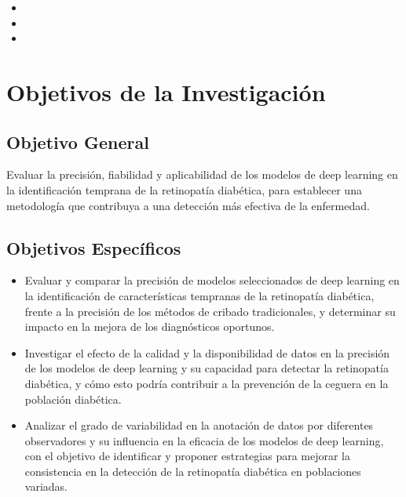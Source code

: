 \begin{itemize}
	\item \Pbone
	\item \Pbtwo
	\item \Pbthree
\end{itemize}

\section{Objetivos de la Investigación}

\subsection{Objetivo General}
\newcommand{\ObjetivoGeneral}{
	Evaluar la precisión, fiabilidad y aplicabilidad de los modelos de deep learning en la identificación temprana de la retinopatía diabética, para establecer una metodología que contribuya a una detección más efectiva de la enfermedad.
}
\ObjetivoGeneral

\subsection{Objetivos Específicos}
\newcommand{\Objone}{
	Evaluar y comparar la precisión de modelos seleccionados de deep learning en la identificación de características tempranas de la retinopatía diabética, frente a la precisión de los métodos de cribado tradicionales, y determinar su impacto en la mejora de los diagnósticos oportunos.
}
\newcommand{\Objtwo}{
	Investigar el efecto de la calidad y la disponibilidad de datos en la precisión de los modelos de deep learning y su capacidad para detectar la retinopatía diabética, y cómo esto podría contribuir a la prevención de la ceguera en la población diabética.
}
\newcommand{\Objthree}{
	Analizar el grado de variabilidad en la anotación de datos por diferentes observadores y su influencia en la eficacia de los modelos de deep learning, con el objetivo de identificar y proponer estrategias para mejorar la consistencia en la detección de la retinopatía diabética en poblaciones variadas.
}
\newcommand{\Objfour}{
	DSAD
}
\newcommand{\Objfive}{

}

\begin{itemize}
	\item \Objone
	\item \Objtwo
	\item \Objthree
\end{itemize}

